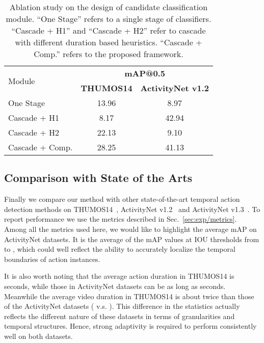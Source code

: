\documentclass[10pt,twocolumn,letterpaper]{article}
\begin{document}
\begin{table}[t]
	\begin{center}
		\begin{tabular}{l|c|c}
			\hline
			\multirow{2}{*}{Module} & \multicolumn{2}{c}{\textbf{mAP@0.5}}                 \\ \cline{2-3} 
			                                     & \textbf{THUMOS14}              & \textbf{ActivityNet v1.2}     \\ \hline
			One Stage                    & 13.96                                     &  8.97            \\ \hline
			Cascade + H1                      & 8.17  & 42.94 \\ \hline Cascade + H2                      & 22.13                                    &                       9.10 \\ \hline 

			Cascade + Comp.                & 28.25                                     &           41.13  \\ \hline
		\end{tabular}
	\end{center}
	\caption{Ablation study on the design of candidate classification module. 
		``One Stage'' refers to a single stage of classifiers. 
		``Cascade + H1'' and ``Cascade + H2'' refer to cascade with different duration based heuristics.
		``Cascade + Comp.'' refers to the proposed framework.}
	\label{table:completeness}
\end{table}

\subsection{Comparison with State of the Arts}
Finally we compare our method with other state-of-the-art temporal action detection methods on THUMOS14~\cite{Jiang2014THUMOS14}, ActivityNet v1.2~\cite{caba2015activitynet} and ActivityNet v1.3~\cite{caba2015activitynet}.
To report performance we use the metrics described in Sec.~\ref{sec:exp/metrics}.
Among all the metrics used here, we would like to highlight the average mAP on ActivityNet datasets.
It is the average of the mAP values at IOU thresholds from  to , 
which could well reflect the ability to accurately localize the temporal boundaries of action instances.

It is also worth noting that the average action duration in THUMOS14 is  seconds, while those in ActivityNet datasets can be as long as  seconds.
Meanwhile the average video duration in THUMOS14 is about twice than those of the ActivityNet datasets ( v.s. ).
This difference in the statistics actually reflects the different nature of these datasets in terms of granularities and temporal structures.
Hence, strong adaptivity is required to perform consistently well on both datasets.
\end{document}
